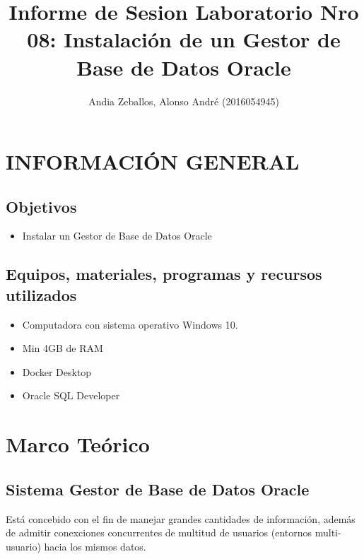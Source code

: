 \documentclass[preprint,12pt]{elsarticle}
\begin{document}
	
	\begin{frontmatter} 

		\title{\huge Informe de Sesion Laboratorio Nro 08: Instalación de un Gestor de Base de Datos Oracle}
		
		\author{Andia Zeballos, Alonso André         	(2016054945)} 
		\address{Escuela Profesional de Ingeniería de Sistemas}
		\address{Universidad Privada de Tacna}
		\address{Tacna, Perú}
		\address{2019}

	\end{frontmatter}



\section{INFORMACIÓN GENERAL} 

\subsection {\textbf{Objetivos}}


\begin{itemize}
	\item Instalar un Gestor de Base de Datos Oracle
\end{itemize}


\subsection {\textbf{Equipos, materiales, programas y recursos utilizados}}
\begin{itemize}
	\item Computadora con sistema operativo Windows 10.
	\item Min 4GB de RAM
	\item Docker Desktop
	\item Oracle SQL Developer
\end{itemize}

\section{Marco Teórico}


\subsection {\textbf{Sistema Gestor de Base de Datos Oracle}}
Está concebido con el fin de manejar grandes cantidades de información, además de admitir conexciones concurrentes de multitud de usuarios (entornos multi-usuario) hacia los mismos datos.
\end{document}
